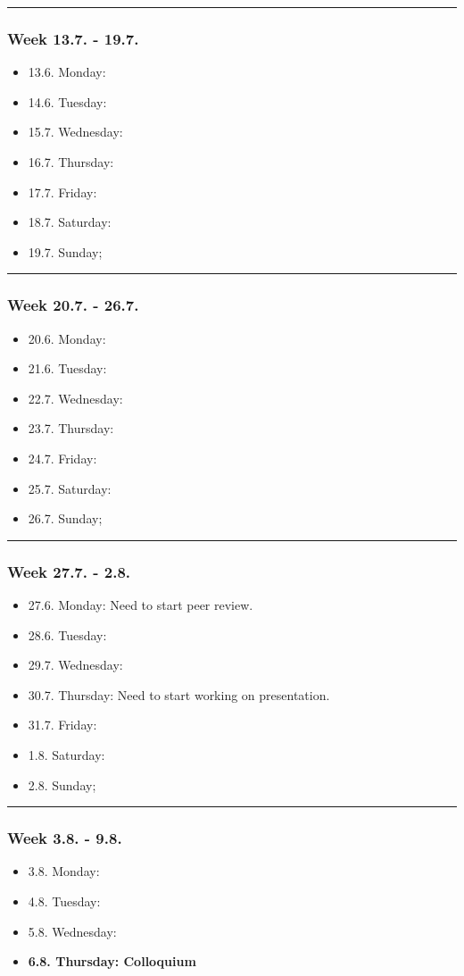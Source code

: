 \clearpage
\hrule
\subsubsection*{Week 13.7. - 19.7.}
\begin{itemize}
  \item 13.6. Monday:
  \item 14.6. Tuesday:
  \item 15.7. Wednesday:
  \item 16.7. Thursday:
  \item 17.7. Friday:
  \item 18.7. Saturday:
  \item 19.7. Sunday;
\end{itemize}

\hrule
\subsubsection*{Week 20.7. - 26.7.}
\begin{itemize}
  \item 20.6. Monday:
  \item 21.6. Tuesday:
  \item 22.7. Wednesday:
  \item 23.7. Thursday:
  \item 24.7. Friday:
  \item 25.7. Saturday:
  \item 26.7. Sunday;
\end{itemize}

\clearpage
\hrule
\subsubsection*{Week 27.7. - 2.8.}
\begin{itemize}
  \item 27.6. Monday: Need to start peer review.
  \item 28.6. Tuesday:
  \item 29.7. Wednesday:
  \item 30.7. Thursday: Need to start working on presentation.
  \item 31.7. Friday:
  \item  1.8. Saturday:
  \item  2.8. Sunday;
\end{itemize}

\hrule
\subsubsection*{Week 3.8. - 9.8.}
\begin{itemize}
  \item  3.8. Monday:
  \item  4.8. Tuesday:
  \item  5.8. Wednesday:
  \item \textbf{6.8. Thursday: Colloquium}
\end{itemize}
